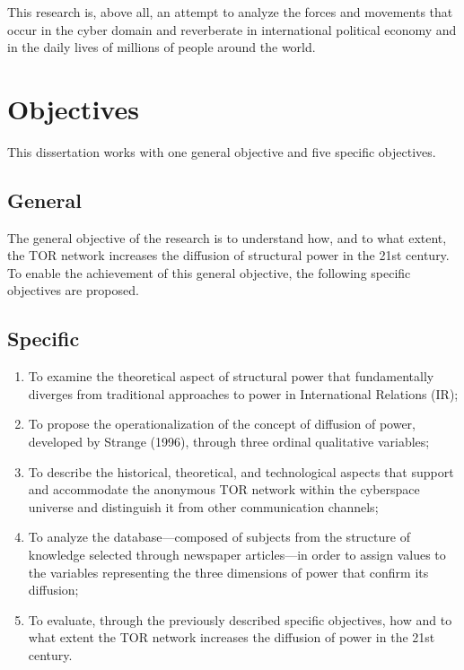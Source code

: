 This research is, above all, an attempt to analyze the forces and movements that occur in the cyber domain and reverberate in international political economy and in the daily lives of millions of people around the world.

\section{Objectives}
This dissertation works with one general objective and five specific objectives.

\subsection{General}
The general objective of the research is to understand how, and to what extent, the TOR network increases the diffusion of structural power in the 21st century. To enable the achievement of this general objective, the following specific objectives are proposed.

\subsection{Specific}
\begin{enumerate}
    \item To examine the theoretical aspect of structural power that fundamentally diverges from traditional approaches to power in International Relations (IR);
    \item To propose the operationalization of the concept of diffusion of power, developed by Strange (1996), through three ordinal qualitative variables;
    \item To describe the historical, theoretical, and technological aspects that support and accommodate the anonymous TOR network within the cyberspace universe and distinguish it from other communication channels;
    \item To analyze the database—composed of subjects from the structure of knowledge selected through newspaper articles—in order to assign values to the variables representing the three dimensions of power that confirm its diffusion;
    \item To evaluate, through the previously described specific objectives, how and to what extent the TOR network increases the diffusion of power in the 21st century.
\end{enumerate}

